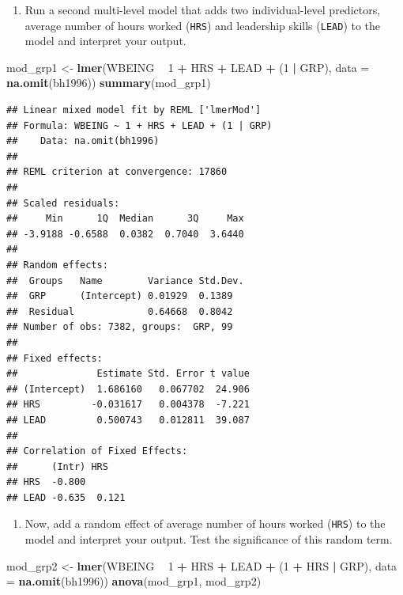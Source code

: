\documentclass[]{book}
\newenvironment{Shaded}{\begin{snugshade}}{\end{snugshade}}
\newcommand{\DataTypeTok}[1]{\textcolor[rgb]{0.13,0.29,0.53}{#1}}
\newcommand{\DecValTok}[1]{\textcolor[rgb]{0.00,0.00,0.81}{#1}}
\newcommand{\KeywordTok}[1]{\textcolor[rgb]{0.13,0.29,0.53}{\textbf{#1}}}
\newcommand{\NormalTok}[1]{#1}
\newcommand{\OperatorTok}[1]{\textcolor[rgb]{0.81,0.36,0.00}{\textbf{#1}}}
\newcommand{\StringTok}[1]{\textcolor[rgb]{0.31,0.60,0.02}{#1}}
\providecommand{\tightlist}{%
  \setlength{\itemsep}{0pt}\setlength{\parskip}{0pt}}
\begin{document}
\begin{enumerate}
\def\labelenumi{\arabic{enumi}.}
\setcounter{enumi}{2}
\tightlist
\item
  Run a second multi-level model that adds two individual-level predictors, average number of hours worked (\texttt{HRS}) and leadership skills (\texttt{LEAD}) to the model and interpret your output.
\end{enumerate}

\begin{Shaded}
\begin{Highlighting}[]
\NormalTok{  mod_grp1 <-}\StringTok{ }\KeywordTok{lmer}\NormalTok{(WBEING }\OperatorTok{~}\StringTok{ }\DecValTok{1} \OperatorTok{+}\StringTok{ }\NormalTok{HRS }\OperatorTok{+}\StringTok{ }\NormalTok{LEAD }\OperatorTok{+}\StringTok{ }\NormalTok{(}\DecValTok{1} \OperatorTok{|}\StringTok{ }\NormalTok{GRP), }\DataTypeTok{data =} \KeywordTok{na.omit}\NormalTok{(bh1996))}
  \KeywordTok{summary}\NormalTok{(mod_grp1)}
\end{Highlighting}
\end{Shaded}

\begin{verbatim}
## Linear mixed model fit by REML ['lmerMod']
## Formula: WBEING ~ 1 + HRS + LEAD + (1 | GRP)
##    Data: na.omit(bh1996)
## 
## REML criterion at convergence: 17860
## 
## Scaled residuals: 
##     Min      1Q  Median      3Q     Max 
## -3.9188 -0.6588  0.0382  0.7040  3.6440 
## 
## Random effects:
##  Groups   Name        Variance Std.Dev.
##  GRP      (Intercept) 0.01929  0.1389  
##  Residual             0.64668  0.8042  
## Number of obs: 7382, groups:  GRP, 99
## 
## Fixed effects:
##              Estimate Std. Error t value
## (Intercept)  1.686160   0.067702  24.906
## HRS         -0.031617   0.004378  -7.221
## LEAD         0.500743   0.012811  39.087
## 
## Correlation of Fixed Effects:
##      (Intr) HRS   
## HRS  -0.800       
## LEAD -0.635  0.121
\end{verbatim}

\begin{enumerate}
\def\labelenumi{\arabic{enumi}.}
\setcounter{enumi}{2}
\tightlist
\item
  Now, add a random effect of average number of hours worked (\texttt{HRS}) to the model and interpret your output. Test the significance of this random term.
\end{enumerate}

\begin{Shaded}
\begin{Highlighting}[]
\NormalTok{  mod_grp2 <-}\StringTok{ }\KeywordTok{lmer}\NormalTok{(WBEING }\OperatorTok{~}\StringTok{ }\DecValTok{1} \OperatorTok{+}\StringTok{ }\NormalTok{HRS }\OperatorTok{+}\StringTok{ }\NormalTok{LEAD }\OperatorTok{+}\StringTok{ }\NormalTok{(}\DecValTok{1} \OperatorTok{+}\StringTok{ }\NormalTok{HRS }\OperatorTok{|}\StringTok{ }\NormalTok{GRP), }\DataTypeTok{data =} \KeywordTok{na.omit}\NormalTok{(bh1996))}
  \KeywordTok{anova}\NormalTok{(mod_grp1, mod_grp2)}
\end{Highlighting}
\end{Shaded}
\end{document}
